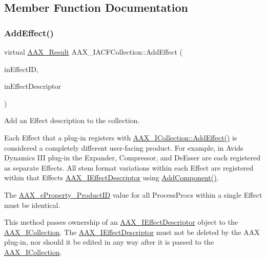 \subsection{Member Function Documentation}
\mbox{\label{a01621_a0fdba73ff6279df807ceac3486ab7630}} 
\subsubsection{\texorpdfstring{AddEffect()}{AddEffect()}}
{\footnotesize\ttfamily virtual \mbox{\hyperlink{a00392_a4d8f69a697df7f70c3a8e9b8ee130d2f}{A\+A\+X\+\_\+\+Result}} A\+A\+X\+\_\+\+I\+A\+C\+F\+Collection\+::\+Add\+Effect (\begin{DoxyParamCaption}\item[{const char $\ast$}]{in\+Effect\+ID,  }\item[{\mbox{\hyperlink{a01409}{I\+A\+C\+F\+Unknown}} $\ast$}]{in\+Effect\+Descriptor }\end{DoxyParamCaption})\hspace{0.3cm}{\ttfamily [pure virtual]}}



Add an Effect description to the collection. 

Each Effect that a plug-\/in registers with \mbox{\hyperlink{a01777_a5ff114b8c4da2081515186f2faf65c8c}{A\+A\+X\+\_\+\+I\+Collection\+::\+Add\+Effect()}} is considered a completely different user-\/facing product. For example, in Avid\textquotesingle{}s Dynamics I\+II plug-\/in the Expander, Compressor, and De\+Esser are each registered as separate Effects. All stem format variations within each Effect are registered within that Effect\textquotesingle{}s \mbox{\hyperlink{a01813}{A\+A\+X\+\_\+\+I\+Effect\+Descriptor}} using \mbox{\hyperlink{a01813_aec33938f50461dd5e7c1dcc25faf6917}{Add\+Component()}}.

The \mbox{\hyperlink{a00662_a13e384f22825afd3db6d68395b79ce0da3a41fcdff5af1a4fd19dcbca7b1ba6f3}{A\+A\+X\+\_\+e\+Property\+\_\+\+Product\+ID}} value for all Process\+Procs within a single Effect must be identical.

This method passes ownership of an \mbox{\hyperlink{a01813}{A\+A\+X\+\_\+\+I\+Effect\+Descriptor}} object to the \mbox{\hyperlink{a01777}{A\+A\+X\+\_\+\+I\+Collection}}. The \mbox{\hyperlink{a01813}{A\+A\+X\+\_\+\+I\+Effect\+Descriptor}} must not be deleted by the A\+AX plug-\/in, nor should it be edited in any way after it is passed to the \mbox{\hyperlink{a01777}{A\+A\+X\+\_\+\+I\+Collection}}.



